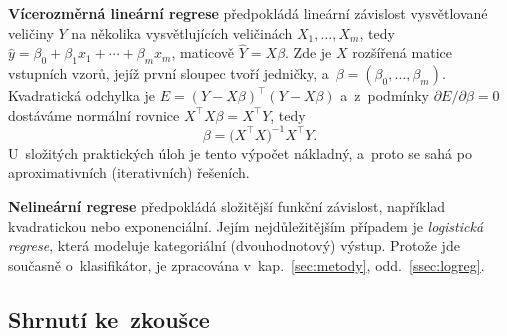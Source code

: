 \documentclass[11pt,a4paper]{article}
\theoremstyle{definition}
\begin{document}
\textbf{Vícerozměrná lineární regrese} předpokládá lineární závislost vysvětlované veličiny
$Y$ na několika vysvětlujících veličinách $X_1,\dots,X_m$, tedy
$\hat y=\beta_0+\beta_1x_1+\cdots+\beta_mx_m$, maticově $\hat Y=X\beta$. Zde je $X$ rozšířená
matice vstupních vzorů, jejíž první sloupec tvoří jedničky, a~$\beta=(\beta_0,\dots,\beta_m)$.
Kvadratická odchylka je $E=(Y-X\beta)^{\!\top}(Y-X\beta)$ a~z~podmínky
$\partial E/\partial\beta=0$ dostáváme normální rovnice $X^{\!\top}\!X\beta=X^{\!\top}Y$,
tedy
\[ \beta=\big(X^{\!\top}\!X\big)^{-1}X^{\!\top}Y. \]
U~složitých praktických úloh je tento výpočet nákladný, a~proto se sahá po aproximativních
(iterativních) řešeních.

\textbf{Nelineární regrese} předpokládá složitější funkční závislost, například kvadratickou
nebo exponenciální. Jejím nejdůležitějším případem je \emph{logistická regrese}, která
modeluje kategoriální (dvouhodnotový) výstup. Protože jde současně o~klasifikátor, je
zpracována v~kap.~\ref{sec:metody}, odd.~\ref{ssec:logreg}.

\subsection{Shrnutí ke~zkoušce}
\end{document}
